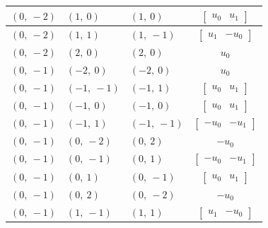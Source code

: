 \documentclass[11pt]{article}
\theoremstyle{definition}
\begin{document}
\begin{longtable}{|l|l|l|c|}
    \hline
    $\left( 0, \  -2\right)$ & $\left( 1, \  0\right)$ & $\left( 1, \  0\right)$ & $\left[\begin{matrix}u_{0} & u_{1}\end{matrix}\right]$ \\
    \hline
    $\left( 0, \  -2\right)$ & $\left( 1, \  1\right)$ & $\left( 1, \  -1\right)$ & $\left[\begin{matrix}u_{1} & - u_{0}\end{matrix}\right]$ \\
    \hline
    $\left( 0, \  -2\right)$ & $\left( 2, \  0\right)$ & $\left( 2, \  0\right)$ & $u_{0}$ \\
    \hline
    $\left( 0, \  -1\right)$ & $\left( -2, \  0\right)$ & $\left( -2, \  0\right)$ & $u_{0}$ \\
    \hline
    $\left( 0, \  -1\right)$ & $\left( -1, \  -1\right)$ & $\left( -1, \  1\right)$ & $\left[\begin{matrix}u_{0} & u_{1}\end{matrix}\right]$ \\
    \hline
    $\left( 0, \  -1\right)$ & $\left( -1, \  0\right)$ & $\left( -1, \  0\right)$ & $\left[\begin{matrix}u_{0} & u_{1}\end{matrix}\right]$ \\
    \hline
    $\left( 0, \  -1\right)$ & $\left( -1, \  1\right)$ & $\left( -1, \  -1\right)$ & $\left[\begin{matrix}- u_{0} & - u_{1}\end{matrix}\right]$ \\
    \hline
    $\left( 0, \  -1\right)$ & $\left( 0, \  -2\right)$ & $\left( 0, \  2\right)$ & $- u_{0}$ \\
    \hline
    $\left( 0, \  -1\right)$ & $\left( 0, \  -1\right)$ & $\left( 0, \  1\right)$ & $\left[\begin{matrix}- u_{0} & - u_{1}\end{matrix}\right]$ \\
    \hline
    $\left( 0, \  -1\right)$ & $\left( 0, \  1\right)$ & $\left( 0, \  -1\right)$ & $\left[\begin{matrix}u_{0} & u_{1}\end{matrix}\right]$ \\
    \hline
    $\left( 0, \  -1\right)$ & $\left( 0, \  2\right)$ & $\left( 0, \  -2\right)$ & $- u_{0}$ \\
    \hline
    $\left( 0, \  -1\right)$ & $\left( 1, \  -1\right)$ & $\left( 1, \  1\right)$ & $\left[\begin{matrix}u_{1} & - u_{0}\end{matrix}\right]$ \\

\end{longtable}
\end{document}
